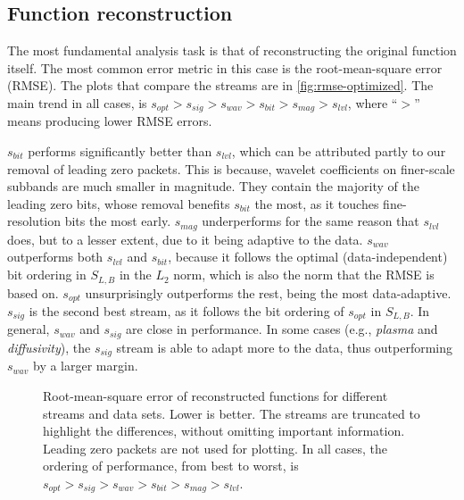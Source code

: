 \subsection{Function reconstruction}\label{sec:rmse-optimized}

The most fundamental analysis task is that of reconstructing the original function itself. The most
common error metric in this case is the root-mean-square error (RMSE). The plots that compare the
streams are in \autoref{fig:rmse-optimized}. The main trend in all cases, is $s_{opt} > s_{sig} >
s_{wav} > s_{bit} > s_{mag} > s_{lvl}$, where ``$>$'' means producing lower RMSE errors.

$s_{bit}$ performs significantly better than $s_{lvl}$, which can be attributed partly to our
removal of leading zero packets. This is because, wavelet coefficients on finer-scale subbands are
much smaller in magnitude. They contain the majority of the leading zero bits, whose removal
benefits $s_{bit}$ the most, as it touches fine-resolution bits the most early. $s_{mag}$
underperforms for the same reason that $s_{lvl}$ does, but to a lesser extent, due to it being
adaptive to the data. $s_{wav}$ outperforms both $s_{lvl}$ and $s_{bit}$, because it follows the
optimal (data-independent) bit ordering in $S_{L,B}$ in the $L_2$ norm, which is also the norm that
the RMSE is based on. $s_{opt}$ unsurprisingly outperforms the rest, being the most data-adaptive.
$s_{sig}$ is the second best stream, as it follows the bit ordering of $s_{opt}$ in $S_{L,B}$. In
general, $s_{wav}$ and $s_{sig}$ are close in performance. In some cases (e.g., \emph{plasma} and
\emph{diffusivity}), the $s_{sig}$ stream is able to adapt more to the data, thus outperforming
$s_{wav}$ by a larger margin.

\begin{figure}[h]
  \centering
		\caption{Root-mean-square error of reconstructed functions for different streams and data sets.
		Lower is better. The streams are truncated to highlight the differences, without omitting
		important information. Leading zero packets are not used for plotting. In all cases, the
		ordering of performance, from best to worst, is $s_{opt} > s_{sig} > s_{wav} > s_{bit} > s_{mag}
		> s_{lvl}$.}\label{fig:rmse-optimized}
\end{figure}

